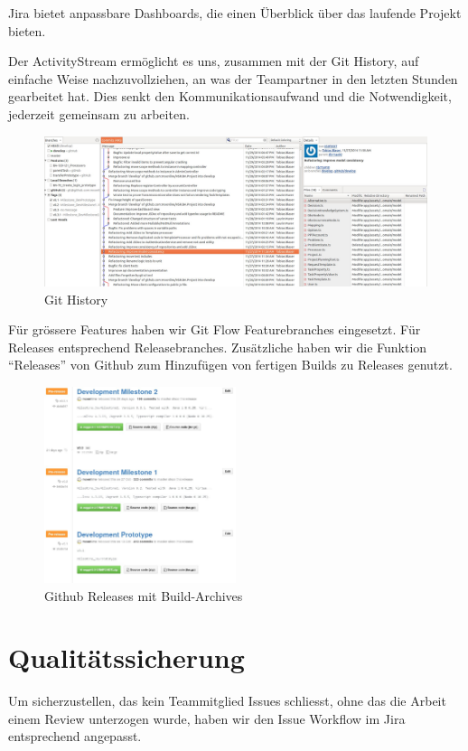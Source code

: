 		Jira bietet anpassbare Dashboards, 
		die einen Überblick über das laufende Projekt bieten.
		
		Der ActivityStream ermöglicht es uns, zusammen mit der Git History,
		auf einfache Weise nachzuvollziehen, an was der Teampartner in
		den letzten Stunden gearbeitet hat. 
		Dies senkt den Kommunikationsaufwand und die Notwendigkeit,
		jederzeit gemeinsam zu arbeiten.
		
		\begin{figure}[H]
			\includegraphics[width=\textwidth]{projectPlan/media/img/gitHistory.jpg}
			\centering
			\caption{Git History}
			\label{fig:gitHistory}
		\end{figure}
		
		Für grössere Features haben wir Git Flow Featurebranches eingesetzt.
		Für Releases entsprechend Releasebranches.
		Zusätzliche haben wir die Funktion ``Releases'' von Github
		zum Hinzufügen von fertigen Builds zu Releases genutzt.
		
		\begin{figure}[H]
			\includegraphics[width=0.5\textwidth]{projectPlan/media/img/githubReleases.jpg}
			\centering
			\caption{Github Releases mit Build-Archives}
			\label{fig:githubReleases}
		\end{figure}

		
	\section{Qualitätssicherung}
		Um sicherzustellen, das kein Teammitglied Issues schliesst,
		ohne das die Arbeit einem Review unterzogen wurde,
		haben wir den Issue Workflow im Jira entsprechend angepasst.		
		
